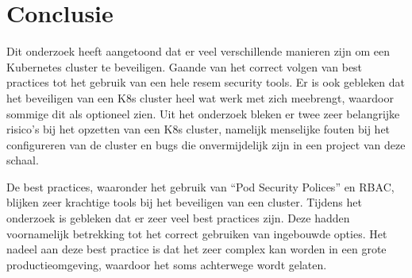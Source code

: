 
\chapter{Conclusie}
\label{ch:conclusie}




	



Dit onderzoek heeft aangetoond dat er veel verschillende manieren zijn om een Kubernetes cluster te beveiligen. Gaande van het correct volgen van best practices tot het gebruik van een hele resem security tools. Er is ook gebleken dat het beveiligen van een K8s cluster heel wat werk met zich meebrengt, waardoor sommige dit als optioneel zien. Uit het onderzoek bleken er twee zeer belangrijke risico's bij het opzetten van een K8s cluster, namelijk menselijke fouten bij het configureren van de cluster en bugs die onvermijdelijk zijn in een project van deze schaal.

De best practices, waaronder het gebruik van ``Pod Security Polices'' en RBAC, blijken zeer krachtige tools bij het beveiligen van een cluster. Tijdens het onderzoek is gebleken dat er zeer veel best practices zijn. Deze hadden voornamelijk betrekking tot het correct gebruiken van ingebouwde opties. Het nadeel aan deze best practice is dat het zeer complex kan worden in een grote productieomgeving, waardoor het soms achterwege wordt gelaten. 

